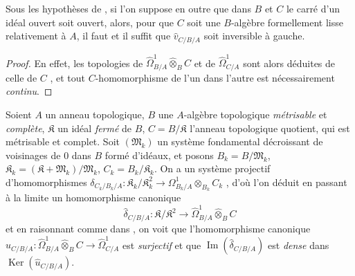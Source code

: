 \begin{corollary}[20.7.19]
\label{0.20.7.19-fr}
Sous les hypothèses de \textup{}, si l'on suppose en outre que dans
$B$ et $C$ le carré d'un idéal ouvert soit ouvert, alors, pour que $C$ soit
une $B$-algèbre formellement lisse relativement à $A$, il faut et il suffit
que $\widehat v_{C/B/A}$ soit inversible à gauche.
\end{corollary}

\begin{proof}
En effet, les topologies de
$\widehat{\Omega}^1_{B/A}\widehat\otimes_B C$ et de
$\widehat{\Omega}^1_{C/A}$ sont alors déduites de celle de $C$
, et tout $C$-homomorphisme de l'un dans l'autre est
nécessairement \emph{continu}.
\end{proof}

\begin{env}[20.7.20]
\label{0.20.7.20-fr}
Soient $A$ un anneau topologique, $B$ une $A$-algèbre topologique
\emph{métrisable} et \emph{complète}, $\mathfrak{K}$ un idéal \emph{fermé} de $B$,
$C=B/\mathfrak{K}$ l'anneau topologique quotient, qui est métrisable et
complet. Soit $(\mathfrak{M}_k)$ un système fondamental décroissant de
voisinages de $0$ dans $B$ formé d'idéaux, et posons
$B_k=B/\mathfrak{M}_k$,
$\mathfrak{K}_k=(\mathfrak{K}+\mathfrak{M}_k)/\mathfrak{M}_k$,
$C_k=B_k/\mathfrak{K}_k$. On a un système projectif d'homomorphismes
$\delta_{C_k/B_k/A}:\mathfrak{K}_k/\mathfrak{K}_k^2\to\Omega^1_{B_k/A}\otimes_{B_k}C_k$
, d'où l'on déduit en passant à la limite un
homomorphisme canonique
\[
  \widehat\delta_{C/B/A}:\mathfrak{K}/\mathfrak{K}^2\to
  \widehat{\Omega}^1_{B/A}\widehat\otimes_B C
\]
et en raisonnant comme dans , on voit que l'homomorphisme
canonique
$\widehat u_{C/B/A}:\widehat{\Omega}^1_{B/A}
\widehat\otimes_B C\to\widehat{\Omega}^1_{C/A}$ est
\emph{surjectif} et que $\operatorname{Im}(\widehat\delta_{C/B/A})$ est
\emph{dense} dans $\operatorname{Ker}(\widehat u_{C/B/A})$.
\end{env}
